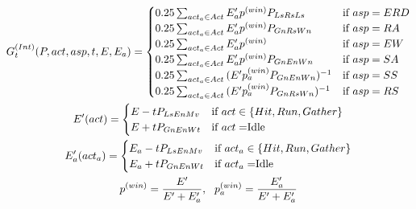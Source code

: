 \begin{equation*}
    \begin{gathered}
        G_t^{(Int)}(P, act, asp, t, E, E_a) = \begin{cases}
            0.25 \sum_{act_a \in Act} {E'_ap^{(win)}P_{LsRsLs}}  & \mbox{if  } asp = ERD\\
            0.25 \sum_{act_a \in Act} {E'_ap^{(win)}P_{GnRsWn}}  & \mbox{if  } asp = RA\\
            0.25 \sum_{act_a \in Act} {E'_ap^{(win)}}  & \mbox{if  } asp = EW\\
            0.25 \sum_{act_a \in Act} {E'_ap^{(win)}P_{GnEnWn}}  & \mbox{if  } asp = SA\\
            0.25 \sum_{act_a \in Act} {(E'p_a^{(win)}P_{GnEnWn})^{-1}}  & \mbox{if  } asp = SS\\
            0.25 \sum_{act_a \in Act} {(E'p_a^{(win)}P_{GnRsWn})^{-1}}  & \mbox{if  } asp = RS
        \end{cases} \\
        E'(act) = \begin{cases}
            E - tP_{LsEnMv} & \mbox{if } act \in \{Hit, Run, Gather\}\\
            E + tP_{GnEnWt} & \mbox{if } act = $Idle$
        \end{cases}\\
        E_a'(act_a) = \begin{cases}
            E_a - tP_{LsEnMv} & \mbox{if } act_a \in \{Hit, Run, Gather\}\\
            E_a + tP_{GnEnWt} & \mbox{if } act_a = $Idle$
        \end{cases}\\
        p^{(win)} = \frac {E'} {E' + E'_a},\ \
        p^{(win)}_a = \frac {E'_a} {E' + E'_a}
    \end{gathered}
\end{equation*}

